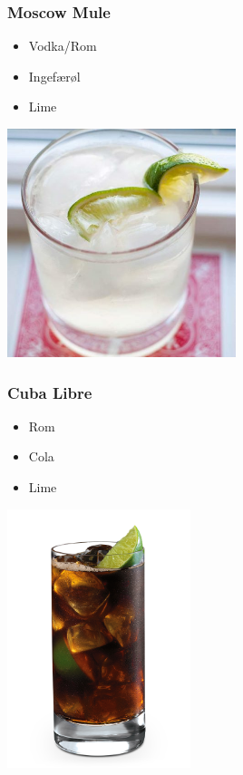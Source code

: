 \documentclass[a4paper,norsk]{article}
\begin{document}
\subsubsection*{Moscow Mule}
\begin{minipage}[c]{0.45\textwidth}
\begin{itemize}
	\item Vodka/Rom
		\item Ingefærøl
		\item Lime
\end{itemize}
\end{minipage}
\hfill
\begin{minipage}[c]{0.45\textwidth}
  \includegraphics[width=0.5\textwidth]{moscowmule.jpg}
\end{minipage}

\subsubsection*{Cuba Libre}
\begin{minipage}[c]{0.45\textwidth}
\begin{itemize}
	\item Rom
		\item Cola
		\item Lime
\end{itemize}
\end{minipage}
\hfill
\begin{minipage}[c]{0.45\textwidth}
  \includegraphics[width=0.4\textwidth]{cubalibre.png}
\end{minipage}
\end{document}
